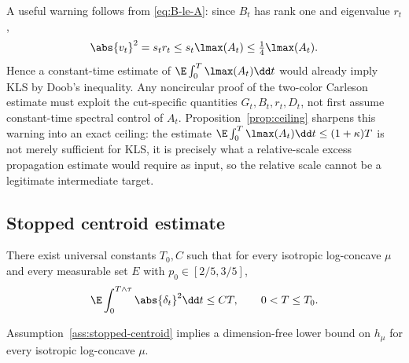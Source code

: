 \documentclass[../../main.tex]{subfiles}
\begin{document}
A useful warning follows from \eqref{eq:B-le-A}: since $B_t$ has rank one and eigenvalue $r_t$,
\begin{equation}\label{eq:trivial-lambda}
  \abs{v_t}^2=s_tr_t\le s_t\lmax(A_t)\le\tfrac14\lmax(A_t).
\end{equation}
Hence a constant-time estimate of $\E\int_0^T\lmax(A_t)\dd t$ would already imply KLS by
Doob's inequality. Any noncircular proof of the two-color Carleson estimate must exploit the
cut-specific quantities $G_t,B_t,r_t,D_t$, not first assume constant-time spectral control of
$A_t$. Proposition~\ref{prop:ceiling} sharpens this warning into an exact ceiling: the estimate
$\E\int_0^T\lmax(A_t)\dd t\le(1+\kappa)T$ is not merely sufficient for KLS, it is precisely what a
relative-scale excess propagation estimate would require as input, so the relative scale cannot be
a legitimate intermediate target.

\subsection{Stopped centroid estimate}

\begin{assumption}
\label{ass:stopped-centroid}
There exist universal constants $T_0,C$ such that for every isotropic log-concave $\mu$ and every
measurable set $E$ with $p_0\in[2/5,3/5]$,
\begin{equation}\label{eq:stopped-centroid}
  \E\int_0^{T\wedge\tau}\abs{\delta_t}^2\dd t\le CT,
  \qquad 0<T\le T_0 .
\end{equation}
\end{assumption}

\begin{theorem}
\label{thm:centroid-implies-kls}
Assumption~\ref{ass:stopped-centroid} implies a dimension-free lower bound on $h_\mu$ for every
isotropic log-concave $\mu$.
\end{theorem}
\end{document}
